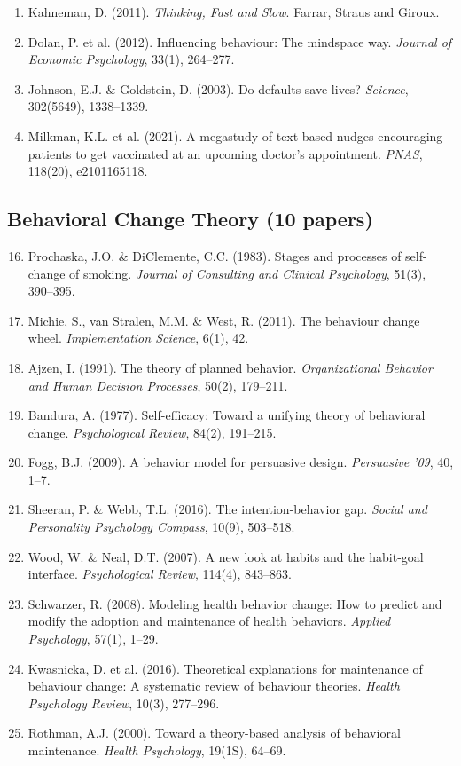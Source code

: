 \begin{enumerate}
    \item Kahneman, D. (2011). \textit{Thinking, Fast and Slow}. Farrar, Straus and Giroux.
    \item Dolan, P. et al. (2012). Influencing behaviour: The mindspace way. \textit{Journal of Economic Psychology}, 33(1), 264--277.
    \item Johnson, E.J. \& Goldstein, D. (2003). Do defaults save lives? \textit{Science}, 302(5649), 1338--1339.
    \item Milkman, K.L. et al. (2021). A megastudy of text-based nudges encouraging patients to get vaccinated at an upcoming doctor's appointment. \textit{PNAS}, 118(20), e2101165118.
\end{enumerate}

\subsection{Behavioral Change Theory (10 papers)}

\begin{enumerate}
    \setcounter{enumi}{15}
    \item Prochaska, J.O. \& DiClemente, C.C. (1983). Stages and processes of self-change of smoking. \textit{Journal of Consulting and Clinical Psychology}, 51(3), 390--395.
    \item Michie, S., van Stralen, M.M. \& West, R. (2011). The behaviour change wheel. \textit{Implementation Science}, 6(1), 42.
    \item Ajzen, I. (1991). The theory of planned behavior. \textit{Organizational Behavior and Human Decision Processes}, 50(2), 179--211.
    \item Bandura, A. (1977). Self-efficacy: Toward a unifying theory of behavioral change. \textit{Psychological Review}, 84(2), 191--215.
    \item Fogg, B.J. (2009). A behavior model for persuasive design. \textit{Persuasive '09}, 40, 1--7.
    \item Sheeran, P. \& Webb, T.L. (2016). The intention-behavior gap. \textit{Social and Personality Psychology Compass}, 10(9), 503--518.
    \item Wood, W. \& Neal, D.T. (2007). A new look at habits and the habit-goal interface. \textit{Psychological Review}, 114(4), 843--863.
    \item Schwarzer, R. (2008). Modeling health behavior change: How to predict and modify the adoption and maintenance of health behaviors. \textit{Applied Psychology}, 57(1), 1--29.
    \item Kwasnicka, D. et al. (2016). Theoretical explanations for maintenance of behaviour change: A systematic review of behaviour theories. \textit{Health Psychology Review}, 10(3), 277--296.
    \item Rothman, A.J. (2000). Toward a theory-based analysis of behavioral maintenance. \textit{Health Psychology}, 19(1S), 64--69.
\end{enumerate}

